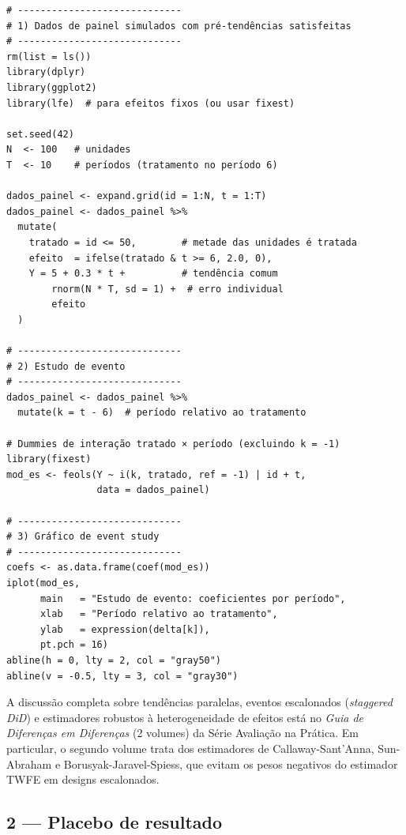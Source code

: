 \begin{lstlisting}[style=Rstyle, caption={Estudo de evento: coeficientes de pré-tendência}]
# -----------------------------
# 1) Dados de painel simulados com pré-tendências satisfeitas
# -----------------------------
rm(list = ls())
library(dplyr)
library(ggplot2)
library(lfe)  # para efeitos fixos (ou usar fixest)

set.seed(42)
N  <- 100   # unidades
T  <- 10    # períodos (tratamento no período 6)

dados_painel <- expand.grid(id = 1:N, t = 1:T)
dados_painel <- dados_painel %>%
  mutate(
    tratado = id <= 50,        # metade das unidades é tratada
    efeito  = ifelse(tratado & t >= 6, 2.0, 0),
    Y = 5 + 0.3 * t +          # tendência comum
        rnorm(N * T, sd = 1) +  # erro individual
        efeito
  )

# -----------------------------
# 2) Estudo de evento
# -----------------------------
dados_painel <- dados_painel %>%
  mutate(k = t - 6)  # período relativo ao tratamento

# Dummies de interação tratado × período (excluindo k = -1)
library(fixest)
mod_es <- feols(Y ~ i(k, tratado, ref = -1) | id + t,
                data = dados_painel)

# -----------------------------
# 3) Gráfico de event study
# -----------------------------
coefs <- as.data.frame(coef(mod_es))
iplot(mod_es,
      main   = "Estudo de evento: coeficientes por período",
      xlab   = "Período relativo ao tratamento",
      ylab   = expression(delta[k]),
      pt.pch = 16)
abline(h = 0, lty = 2, col = "gray50")
abline(v = -0.5, lty = 3, col = "gray30")
\end{lstlisting}

\begin{conexaobox}
A discussão completa sobre tendências paralelas, eventos escalonados (\textit{staggered DiD}) e estimadores robustos à heterogeneidade de efeitos está no \textit{Guia de Diferenças em Diferenças} (2 volumes) da Série Avaliação na Prática. Em particular, o segundo volume trata dos estimadores de Callaway-Sant'Anna, Sun-Abraham e Borusyak-Jaravel-Spiess, que evitam os pesos negativos do estimador TWFE em designs escalonados.
\end{conexaobox}

\subsection*{2 — Placebo de resultado}


